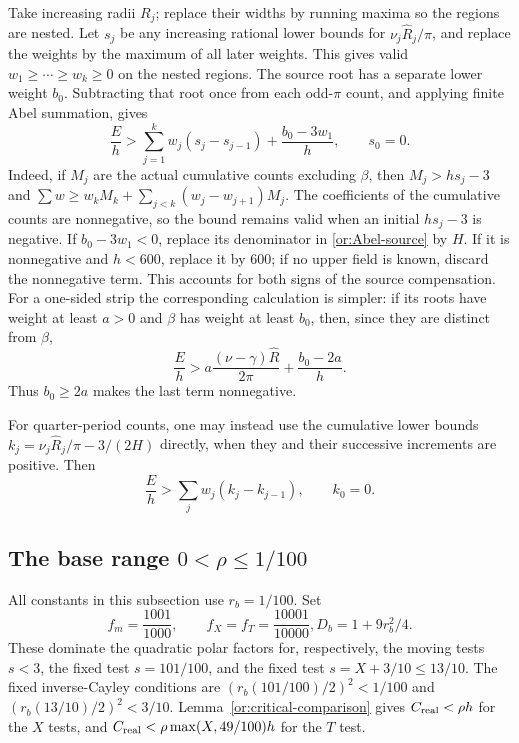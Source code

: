 \documentclass[11pt,reqno]{amsart}
\numberwithin{equation}{section}
\theoremstyle{definition}
\theoremstyle{remark}
\begin{document}
Take increasing radii $R_j$; replace their widths by running maxima
so the regions are nested.  Let $s_j$ be any increasing rational lower
bounds for $\nu_j\widehat R_j/\pi$, and replace the weights by the
maximum of all later weights.  This gives valid
$w_1\ge\cdots\ge w_k\ge0$ on the nested regions.  The source root
has a separate lower weight $b_0$.  Subtracting that root once from
each odd-$\pi$ count, and applying finite Abel summation, gives
\begin{equation}\label{or:Abel-source}
 \frac Eh>
     \sum_{j=1}^k w_j(s_j-s_{j-1})+\frac{b_0-3w_1}{h},
                         \qquad s_0=0.
\end{equation}
Indeed, if $M_j$ are the actual cumulative counts excluding $\beta$,
then $M_j>hs_j-3$ and
$\sum w\ge w_kM_k+\sum_{j<k}(w_j-w_{j+1})M_j$.
The coefficients of the cumulative counts are nonnegative, so the bound
remains valid when an initial $hs_j-3$ is negative.
If $b_0-3w_1<0$, replace its denominator
in \eqref{or:Abel-source} by $H$.  If it is nonnegative and $h<600$,
replace it by $600$; if no upper field is known, discard the
nonnegative term.  This accounts for both signs of the source
compensation.
For a one-sided strip the corresponding calculation is simpler:
if its roots have weight at least $a>0$ and $\beta$ has weight at
least $b_0$, then, since they are distinct from $\beta$,
\begin{equation}\label{or:strip-source-compensation}
 \frac Eh>
 a\frac{(\nu-\gamma)\widehat R}{2\pi}+\frac{b_0-2a}{h}.
\end{equation}
Thus $b_0\ge2a$ makes the last term nonnegative.

For quarter-period counts, one may instead use the cumulative lower
bounds $k_j=\nu_j\widehat R_j/\pi-3/(2H)$ directly, when they and
their successive increments are positive.  Then
\begin{equation}\label{or:Abel-quarter}
                    \frac Eh>\sum_jw_j(k_j-k_{j-1}),\qquad k_0=0.
\end{equation}

\subsection{The base range $0<\rho\le1/100$}

All constants in this subsection use $r_b=1/100$.  Set
\begin{equation}\label{or:base-polar}
 f_m=\frac{1001}{1000},\qquad f_X=f_T=\frac{10001}{10000},
                    D_b=1+9r_b^2/4.
\end{equation}
These dominate the quadratic polar factors for, respectively, the
moving tests $s<3$, the fixed test $s=101/100$, and the fixed test
$s=X+3/10\le13/10$.  The fixed inverse-Cayley conditions are
$(r_b(101/100)/2)^2<1/100$ and
$(r_b(13/10)/2)^2<3/10$.  Lemma~\ref{or:critical-comparison} gives
$C_{\rm real}<\rho h$ for the $X$ tests, and
$C_{\rm real}<\rho\max(X,49/100)h$ for the $T$ test.
\end{document}
